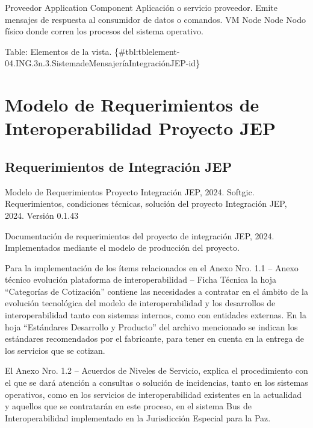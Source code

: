 \documentclass[
  paper=a4,
  ,captions=tableheading
]{scrartcl}
\renewenvironment{quote}{\begin{customblockquote}\list{}{\rightmargin=0em\leftmargin=0em}%
\item\relax\color{blockquote-text}\ignorespaces}{\unskip\unskip\endlist\end{customblockquote}}
\begin{document}
\textbar{} \textbar{} Proveedor \textbar{} Application Component
\textbar{} Aplicación o servicio proveedor. Emite mensajes de respuesta
al consumidor de datos o comandos. \textbar{} \textbar{} VM Node
\textbar{} Node \textbar{} Nodo físico donde corren los procesos del
sistema operativo. \textbar{}

Table: Elementos de la vista.
\{\#tbl:tblelement-04.ING.3n.3.SistemadeMensajeríaIntegraciónJEP-id\}

\newpage

\section{Modelo de Requerimientos de Interoperabilidad Proyecto
JEP}\label{sec:modelo-de-requerimientos-de-interoperabilidad-proyecto-jep}

\subsection{Requerimientos de Integración
JEP}\label{sec:requerimientos-de-integraciuxf3n-jep}

\begin{quote}
Modelo de Requerimientos Proyecto Integración JEP, 2024. Softgic.
Requerimientos, condiciones técnicas, solución del proyecto Integración
JEP, 2024. Versión 0.1.43
\end{quote}

Documentación de requerimientos del proyecto de integración JEP, 2024.
Implementados mediante el modelo de producción del proyecto.

Para la implementación de los ítems relacionados en el Anexo Nro. 1.1 --
Anexo técnico evolución plataforma de interoperabilidad -- Ficha Técnica
la hoja ``Categorías de Cotización'' contiene las necesidades a
contratar en el ámbito de la evolución tecnológica del modelo de
interoperabilidad y los desarrollos de interoperabilidad tanto con
sistemas internos, como con entidades externas. En la hoja ``Estándares
Desarrollo y Producto'' del archivo mencionado se indican los estándares
recomendados por el fabricante, para tener en cuenta en la entrega de
los servicios que se cotizan.

El Anexo Nro. 1.2 -- Acuerdos de Niveles de Servicio, explica el
procedimiento con el que se dará atención a consultas o solución de
incidencias, tanto en los sistemas operativos, como en los servicios de
interoperabilidad existentes en la actualidad y aquellos que se
contratarán en este proceso, en el sistema Bus de Interoperabilidad
implementado en la Jurisdicción Especial para la Paz.
\end{document}
